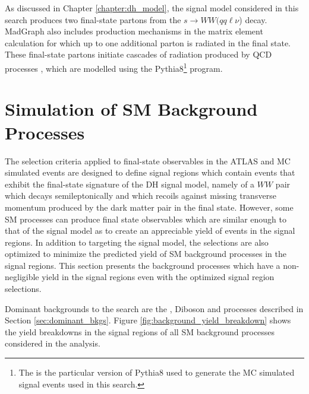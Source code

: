 As discussed in Chapter \ref{chapter:dh_model}, the signal model considered in this search produces two final-state partons from the \(s \rightarrow WW(qq\ell\nu\)) decay. MadGraph also includes production mechanisms in the matrix element calculation for which up to one additional parton is radiated in the final state. These final-state partons initiate cascades of radiation produced by QCD processes \cite{parton_shower}, which are modelled using the Pythia8\footnote{The \PYTHIA[8.230]\cite{Sjostrand:2014zea} is the particular version of Pythia8 used to generate the MC simulated signal events used in this search.} program.

\section{Simulation of SM Background Processes}
\label{sec:SM_bkg_sim}

The selection criteria applied to final-state observables in the ATLAS and MC simulated events are designed to define signal regions which contain events that exhibit the final-state signature of the DH signal model, namely of a \(WW\) pair which decays semileptonically and which recoils against missing transverse momentum produced by the dark matter pair in the final state. However, some SM processes can produce final state observables which are similar enough to that of the signal model as to create an appreciable yield of events in the signal regions. In addition to targeting the signal model, the selections are also optimized to minimize the predicted yield of SM background processes in the signal regions. This section presents the background processes which have a non-negligible yield in the signal regions even with the optimized signal region selections.

Dominant backgrounds to the search are the \wjets, Diboson and \ttbar processes described in Section \ref{sec:dominant_bkgs}. 
Figure \ref{fig:background_yield_breakdown} shows the yield breakdowns in the signal regions of all SM background processes considered in the analysis.

